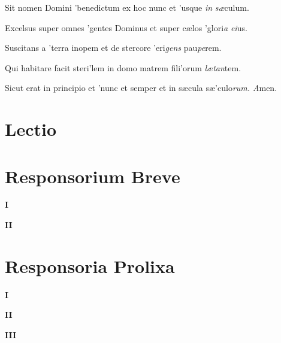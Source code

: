 \documentclass[initial=ZallmanCaps,staff=19,font=greciliae,11pt,a4paper,openany,twoside,choralsign=PfefferMediaeval]{gregorian}
\begin{document}
\par
{}
\par
\vskip9bp
\begin{multicols}{2}\setlength{\columnseprule}{0.2px}
Sit nomen Domini 'benedictum \grestar{} ex hoc nunc et 'usque \textit{in} \textit{sæ}culum.\par
{}\par
Excelsus super omnes 'gentes Dominus \grestar{} et super cælos 'glori\textit{a} \textit{ei}us.\par
{}\par
Suscitans a 'terra inopem \grestar{} et de stercore 'eri\textit{gens} pau\textit{pe}rem.\par
{}\par
Qui habitare facit steri'lem in domo \grestar{} matrem fili'orum \textit{lætan}tem.\par
{}\par
Sicut erat in principio et 'nunc et semper \grestar{} et in sæcula sæ'culo\textit{rum. A}men.\par
\end{multicols}
\section*{Lectio}
\newpage
\section*{Responsorium Breve}
\textbf{I}\par
{}
\par
\textbf{II}\par
{}
\par
\section*{Responsoria Prolixa}
\textbf{I}\par
{}
\newpage
\textbf{II}\par
{}
\par
\textbf{III}\par
{}
\newpage
\end{document}
